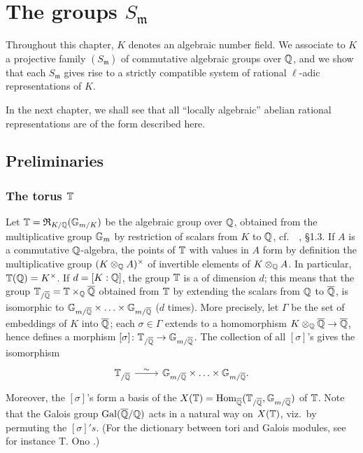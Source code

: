 \chapter{The groups \texorpdfstring{$S_{\mathfrak{m}}$}{Sm}}
\label{ch:ii}

Throughout this chapter,
\dpage
$K$ denotes an algebraic number field.
We associate to $K$ a projective family $(S_{\mathfrak{m}})$ of commutative
algebraic groups over $\mathbb{Q}$, and we show that each $S_{\mathfrak{m}}$ gives rise
to a strictly compatible system of rational $\ell$-adic representations of $K$.

In the next chapter, we shall see that all ``locally algebraic''
abelian rational representations are of the form described here.

\section{Preliminaries}
\label{sec:II_1}

\subsection{The torus $\mathbb{T}$}
\label{sec:II_11}
Let $\mathbb{T} = \operatorname{\mathfrak{R}}_{K/\mathbb{Q}}(\mathbb{G}_{m/K})$ be the algebraic group over $\mathbb{Q}$, obtained
from the multiplicative group $\mathbb{G}_m$ by restriction of
scalars from $K$ to $\mathbb{Q}$, cf.\ \citeauthor{43}~\cite{43}, \S 1.3.
If $A$ is a commutative $\mathbb{Q}$-algebra, the points of $\mathbb{T}$ with values in $A$
form by definition the multiplicative group $(K \otimes_{\mathbb{Q}} A)^\times$ of
invertible elements of $K \otimes_{\mathbb{Q}} A$.  In particular, $\mathbb{T}(\mathbb{Q}) = K^\times$.
If $d = [K : \mathbb{Q}]$, the group $\mathbb{T}$ is a  of
dimension $d$; this means that the group $\mathbb{T}_{/\overline{\mathbb{Q}}} = \mathbb{T} \times_{\mathbb{Q}}
\overline{\mathbb{Q}}$ obtained from $\mathbb{T}$ by extending the scalars from $\mathbb{Q}$ to $\overline{\mathbb{Q}}$,
is isomorphic
\dpage
to $\mathbb{G}_{m/\overline{\mathbb{Q}}} \times \hdots \times
\mathbb{G}_{m/\overline{\mathbb{Q}}}$ ($d$ times).
More precisely, let $\Gamma$ be the set of embeddings of $K$ into $\overline{\mathbb{Q}}$;
each $\sigma \in \Gamma$ extends to a homomorphism $K \otimes_{\mathbb{Q}} \overline{\mathbb{Q}}
\to \overline{\mathbb{Q}}$, hence defines a morphism $[\sigma]\colon \mathbb{T}_{/\overline{\mathbb{Q}}} \to
\mathbb{G}_{m/\overline{\mathbb{Q}}}$. The collection of all $[\sigma]$'s gives the isomorphism
\[\begin{tikzcd}
	\TT_{/ \algcl{\Q}} \rar["\sim"] & \subbch{\GG}{m}{\algcl{\Q}} \times
	\hdots \times \subbch{\GG}{m}{\algcl{\Q}}.
\end{tikzcd}\]
Moreover, the $[\sigma]$'s form a basis of the  $X(\TT) = \Hom_{\algcl{\Q}}(\TT_{/\algcl{\Q}},
\break \subbch{\GG}{m}{\algcl{\Q}})$ of $\mathbb{T}$.
Note that the Galois group $\operatorname{Gal}(\overline{\mathbb{Q}} / \mathbb{Q})$ acts in a natural way on
$X(\mathbb{T})$, viz.\ by permuting the $[\sigma]'s$.
(For the dictionary between tori and Galois modules, see for instance T. Ono
\cite{21}.)

